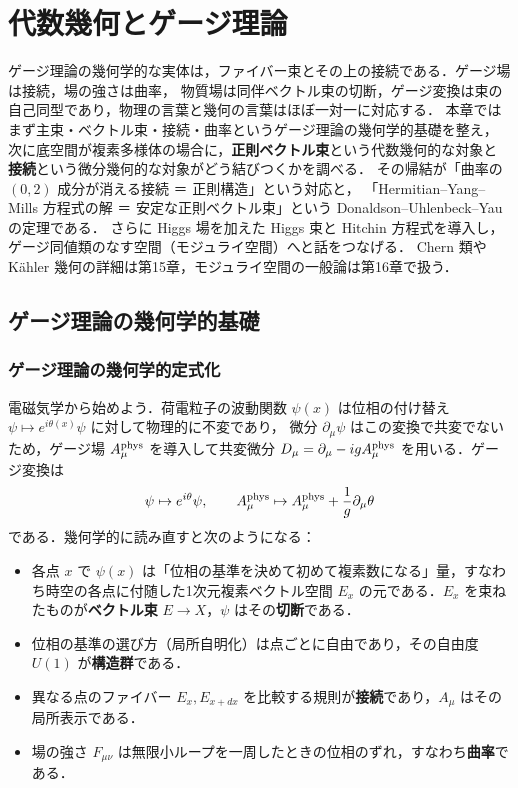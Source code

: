 \chapter{代数幾何とゲージ理論}
\label{ch:ch14}

\begin{chapterlead}
ゲージ理論の幾何学的な実体は，ファイバー束とその上の接続である．ゲージ場は接続，場の強さは曲率，
物質場は同伴ベクトル束の切断，ゲージ変換は束の自己同型であり，物理の言葉と幾何の言葉はほぼ一対一に対応する．
本章ではまず主束・ベクトル束・接続・曲率というゲージ理論の幾何学的基礎を整え，
次に底空間が複素多様体の場合に，\textbf{正則ベクトル束}という代数幾何的な対象と
\textbf{接続}という微分幾何的な対象がどう結びつくかを調べる．
その帰結が「曲率の $(0,2)$ 成分が消える接続 ＝ 正則構造」という対応と，
「Hermitian--Yang--Mills 方程式の解 ＝ 安定な正則ベクトル束」という Donaldson--Uhlenbeck--Yau の定理である．
さらに Higgs 場を加えた Higgs 束と Hitchin 方程式を導入し，ゲージ同値類のなす空間（モジュライ空間）へと話をつなげる．
Chern 類や Kähler 幾何の詳細は第15章，モジュライ空間の一般論は第16章で扱う．
\end{chapterlead}

\section{ゲージ理論の幾何学的基礎}

\subsection{ゲージ理論の幾何学的定式化}

電磁気学から始めよう．荷電粒子の波動関数 $\psi(x)$ は位相の付け替え $\psi\mapsto e^{i\theta(x)}\psi$ に対して物理的に不変であり，
微分 $\partial_\mu\psi$ はこの変換で共変でないため，ゲージ場 $A^{\rm phys}_\mu$ を導入して共変微分
$D_\mu = \partial_\mu - i g A^{\rm phys}_\mu$ を用いる．ゲージ変換は
\begin{equation}
  \psi\mapsto e^{i\theta}\psi,\qquad A^{\rm phys}_\mu\mapsto A^{\rm phys}_\mu + \frac1g\partial_\mu\theta
\end{equation}
である．幾何学的に読み直すと次のようになる：
\begin{itemize}
  \item 各点 $x$ で $\psi(x)$ は「位相の基準を決めて初めて複素数になる」量，すなわち時空の各点に付随した1次元複素ベクトル空間 $E_x$ の元である．$E_x$ を束ねたものが\textbf{ベクトル束} $E\to X$，$\psi$ はその\textbf{切断}である．
  \item 位相の基準の選び方（局所自明化）は点ごとに自由であり，その自由度 $U(1)$ が\textbf{構造群}である．
  \item 異なる点のファイバー $E_x,E_{x+dx}$ を比較する規則が\textbf{接続}であり，$A_\mu$ はその局所表示である．
  \item 場の強さ $F_{\mu\nu}$ は無限小ループを一周したときの位相のずれ，すなわち\textbf{曲率}である．
\end{itemize}

